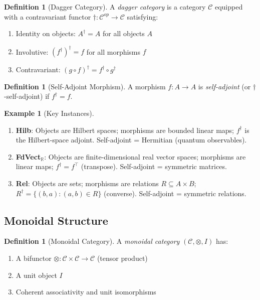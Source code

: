\documentclass[11pt]{article}
\theoremstyle{definition}
\newtheorem{definition}[theorem]{Definition}
\newtheorem{example}[theorem]{Example}
\theoremstyle{remark}
\begin{document}
\begin{definition}[Dagger Category]
A \emph{dagger category} is a category $\mathcal{C}$ equipped with a contravariant functor $\dagger : \mathcal{C}^{op} \to \mathcal{C}$ satisfying:
\begin{enumerate}[label=(\roman*)]
    \item Identity on objects: $A^\dagger = A$ for all objects $A$
    \item Involutive: $(f^\dagger)^\dagger = f$ for all morphisms $f$
    \item Contravariant: $(g \circ f)^\dagger = f^\dagger \circ g^\dagger$
\end{enumerate}
\end{definition}

\begin{definition}[Self-Adjoint Morphism]
A morphism $f : A \to A$ is \emph{self-adjoint} (or $\dagger$-self-adjoint) if $f^\dagger = f$.
\end{definition}

\begin{example}[Key Instances]
\begin{enumerate}
    \item \textbf{Hilb}: Objects are Hilbert spaces; morphisms are bounded linear maps; $f^\dagger$ is the Hilbert-space adjoint. Self-adjoint = Hermitian (quantum observables).
    
    \item \textbf{FdVect}$_\mathbb{R}$: Objects are finite-dimensional real vector spaces; morphisms are linear maps; $f^\dagger = f^\top$ (transpose). Self-adjoint = symmetric matrices.
    
    \item \textbf{Rel}: Objects are sets; morphisms are relations $R \subseteq A \times B$; $R^\dagger = \{(b,a) : (a,b) \in R\}$ (converse). Self-adjoint = symmetric relations.
\end{enumerate}
\end{example}

\subsection{Monoidal Structure}

\begin{definition}[Monoidal Category]
A \emph{monoidal category} $(\mathcal{C}, \otimes, I)$ has:
\begin{enumerate}[label=(\roman*)]
    \item A bifunctor $\otimes : \mathcal{C} \times \mathcal{C} \to \mathcal{C}$ (tensor product)
    \item A unit object $I$
    \item Coherent associativity and unit isomorphisms
\end{enumerate}
\end{definition}
\end{document}
